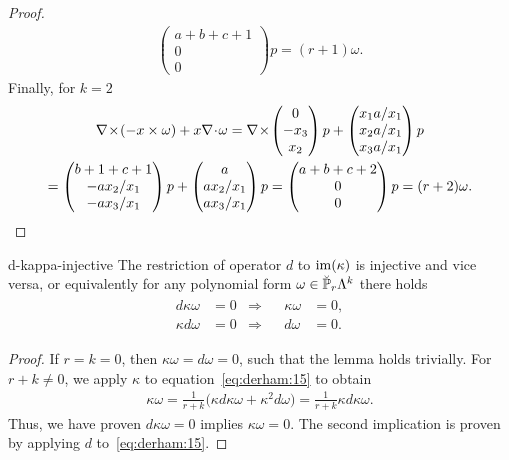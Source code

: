 \begin{proof}
\begin{multline*}
\begin{pmatrix}
      a+b+c+1 \\0\\0
    \end{pmatrix}p
    = (r+1)\omega.
  \end{multline*}
  Finally, for $k=2$
  \begin{multline*}
    \curl(-x\times \omega) + x \div \omega
    = \curl
    \begin{pmatrix}
      0 \\ -x_3 \\ x_2
    \end{pmatrix}p
    +
    \begin{pmatrix}
      x_1 a/x_1\\x_2 a/x_1\\x_3 a/x_1\\
    \end{pmatrix}p
    \\=
    \begin{pmatrix}
      b+1+c+1\\-ax_2/x_1 \\ -a x_3/x_1
    \end{pmatrix}p
    +
    \begin{pmatrix}
      a\\ax_2/x_1\\ax_3/x_1
    \end{pmatrix}p
    =
    \begin{pmatrix}
      a+b+c+2\\0\\0
    \end{pmatrix}p
    = (r+2)\omega.
  \end{multline*}
\end{proof}

\begin{Lemma}{d-kappa-injective}
  The restriction of operator $d$ to $\range \kappa$ is injective and
  vice versa, or equivalently for any polynomial form
  $\omega\in \breve \P_r\Lambda^k$ there holds
  \begin{gather}
    \label{eq:derham:16}
    \begin{aligned}
      d\kappa\omega &= 0 &\Longrightarrow&& \kappa\omega &= 0,\\
      \kappa d\omega &= 0 &\Longrightarrow&& d\omega &= 0.
    \end{aligned}
  \end{gather}
\end{Lemma}

\begin{proof}
  If $r=k=0$, then $\kappa\omega = d\omega = 0$, such that the lemma
  holds trivially. For $r+k\neq 0$, we apply $\kappa$ to
  equation~\eqref{eq:derham:15} to obtain
  \begin{gather*}
    \kappa\omega = \frac1{r+k}
    \bigl(\kappa d\kappa\omega + \kappa^2d\omega\bigr)
    = \frac1{r+k}\kappa d\kappa\omega.
  \end{gather*}
  Thus, we have proven $d\kappa\omega=0$ implies $\kappa\omega=0$. The
  second implication is proven by applying $d$ to~\eqref{eq:derham:15}.
\end{proof}

